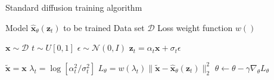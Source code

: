 \begin{algorithm}[H]
    \centering
    \caption{Standard diffusion training algorithm \cite{v_prediction}}
    \label{alg:ddpm_training_before_distillation}
    \begin{algorithmic}
        \Require Model $\hat{\mathbf{x}}_{\theta}(\mathbf{z}_t)$ to be trained
        \Require Data set $\mathcal{D}$
        \Require Loss weight function $w()$
        
            \State $\mathbf{x} \sim \mathcal{D}$ 
            \State $t \sim U[0,1]$ 
            \State $\epsilon \sim \mathcal{N}(0, I)$ 
            \State $\mathbf{z}_t = \alpha_t \mathbf{x} + \sigma_t \epsilon$ 
            
            \State $\tilde{\mathbf{x}} = \mathbf{x}$ 
            \State $\lambda_t = \log[\alpha_t^2/\sigma_t^2]$ 
            \State $L_{\theta} = w(\lambda_t) \|\tilde{\mathbf{x}} - \hat{\mathbf{x}}_{\theta}(\mathbf{z}_t)\|_2^2$ 
            \State $\theta \gets \theta - \gamma \nabla_{\theta} L_{\theta}$ 
        \EndWhile
    \end{algorithmic}
\end{algorithm}



